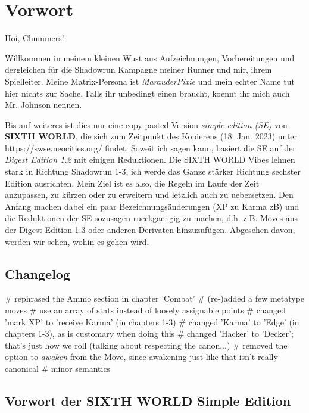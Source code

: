 \chapter{Vorwort}

Hoi, Chummers!

Willkommen in meinem kleinen Wust aus Aufzeichnungen, Vorbereitungen und dergleichen für die Shadowrun Kampagne meiner Runner und mir, ihrem Spielleiter. Meine Matrix-Persona ist \textit{MarauderPixie} und mein echter Name tut hier nichts zur Sache. Falls ihr unbedingt einen braucht, koennt ihr mich auch Mr. Johnson nennen.

Bis auf weiteres ist dies nur eine copy-pasted Version \textit{simple edition (SE)} von \textbf{SIXTH WORLD}, die sich zum Zeitpunkt des Kopierens (18. Jan. 2023) unter https://swse.neocities.org/ findet. Soweit ich sagen kann, basiert die SE auf der \textit{Digest Edition 1.2} mit einigen Reduktionen. Die SIXTH WORLD Vibes lehnen stark in Richtung Shadowrun 1-3, ich werde das Ganze stärker Richtung sechster Edition ausrichten. Mein Ziel ist es also, die Regeln im Laufe der Zeit anzupassen, zu kürzen oder zu erweitern und letzlich auch zu uebersetzen. Den Anfang machen dabei ein paar Bezeichnungsänderungen (XP zu Karma zB) und die Reduktionen der SE sozusagen rueckgaengig zu machen, d.h. z.B. Moves aus der Digest Edition 1.3 oder anderen Derivaten hinzuzufügen. Abgesehen davon, werden wir sehen, wohin es gehen wird. 

\section{Changelog}

\begin{easylist}
# rephrased the Ammo section in chapter 'Combat'
# (re-)added a few metatype moves
# use an array of stats instead of loosely assignable points
# changed 'mark XP' to 'receive Karma' (in chapters 1-3)
# changed 'Karma' to 'Edge' (in chapters 1-3), as is customary when doing this
# changed 'Hacker' to 'Decker'; that's just how we roll (talking about respecting the canon...)
# removed the option to \textit{awaken} from the  Move, since awakening just like that isn't really canonical
# minor semantics
\end{easylist}


\section{Vorwort der SIXTH WORLD Simple Edition}

